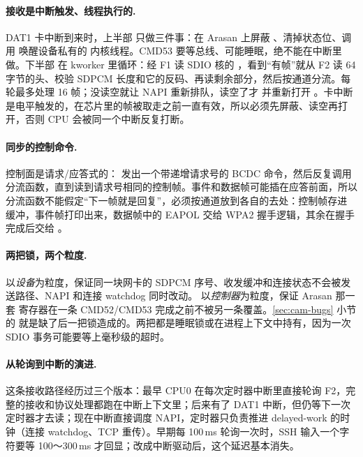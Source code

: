\paragraph{接收是中断触发、线程执行的.} DAT1 卡中断到来时，上半部  只做三件事：在 Arasan 上屏蔽 、清掉状态位、调用  唤醒设备私有的  内核线程。CMD53 要等总线、可能睡眠，绝不能在中断里做。下半部  在 kworker 里循环：经 F1 读 SDIO 核的 ，看到“有帧”就从 F2 读 64 字节的头、校验 SDPCM 长度和它的反码、再读剩余部分，然后按通道分流。每轮最多处理 16 帧；没读空就让 NAPI 重新排队，读空了才  并重新打开 。卡中断是电平触发的，在芯片里的帧被取走之前一直有效，所以必须先屏蔽、读空再打开，否则 CPU 会被同一个中断反复打断。

\paragraph{同步的控制命令.} 控制面是请求/应答式的： 发出一个带递增请求号的 BCDC 命令，然后反复调用分流函数，直到读到请求号相同的控制帧。事件和数据帧可能插在应答前面，所以分流函数不能假定“下一帧就是回复”，必须按通道放到各自的去处：控制帧存进  缓冲，事件帧打印出来，数据帧中的 EAPOL 交给 WPA2 握手逻辑，其余在握手完成后交给 。

\paragraph{两把锁，两个粒度.}  以\emph{设备}为粒度，保证同一块网卡的 SDPCM 序号、收发缓冲和连接状态不会被发送路径、NAPI 和连接 watchdog 同时改动。 以\emph{控制器}为粒度，保证 Arasan 那一套  寄存器在一条 CMD52/CMD53 完成之前不被另一条覆盖。\ref{sec:cam-bugs} 小节的  就是缺了后一把锁造成的。两把都是睡眠锁或在进程上下文中持有，因为一次 SDIO 事务可能要等上毫秒级的超时。

\paragraph{从轮询到中断的演进.} 这条接收路径经历过三个版本：最早 CPU0 在每次定时器中断里直接轮询 F2，完整的接收和协议处理都跑在中断上下文里；后来有了 DAT1 中断，但仍等下一次定时器才去读；现在中断直接调度 NAPI，定时器只负责推进 delayed-work 的时钟（连接 watchdog、TCP 重传）。早期每 100\,ms 轮询一次时，SSH 输入一个字符要等 100～300\,ms 才回显；改成中断驱动后，这个延迟基本消失。

